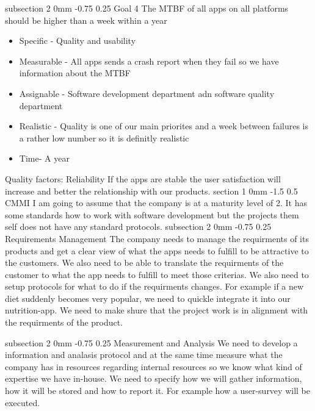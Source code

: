 \documentclass[a4paper,11pt]{article}
\makeatletter
\renewcommand{\section}{\@startsection
   {section}%
   {1}%
   {0mm}%
   {-1.5\baselineskip}%
   {0.5\baselineskip}%
   {\sffamily\bfseries\upshape\normalsize}}%
\renewcommand{\subsection}{\@startsection
   {subsection}%
   {2}%
   {0mm}%
   {-0.75\baselineskip}%
   {0.25\baselineskip}%
   {\rmfamily\normalfont\slshape\normalsize}}%
\makeatother
\begin{document}
\subsection{Goal 4}
The MTBF of all apps on all platforms should be higher than a week within a year
\begin{itemize}
\item Specific - Quality and usability
\item Measurable - All apps sends a crash report when they fail so we have information about the MTBF
\item Assignable - Software development department adn software quality department
\item Realistic - Quality is one of our main priorites and a week between failures is a rather low number so it is definitly realistic
\item Time- A year
\end{itemize}
Quality factors: Reliability \newline
If the apps are stable the user satisfaction will increase and better the relationship with our products.
\section{CMMI}
I am going to assume that the company is at a maturity level of 2. It has some standards how to work with software development but the projects them self does not have any standard protocols.
\subsection{Requirements Management}
 The company needs to manage the requirments of its products and get a clear view of what the apps needs to fulfill to be attractive to the customers. We also need to be able to translate the requirments of the customer to what the app needs to fulfill to meet those criterias. \newline
 \newline We also need to setup protocols for what to do if the requirments changes. For example if a new diet suddenly becomes very popular, we need to quickle integrate it into our nutrition-app. We need to make shure that the project work is in alignment with the requirments of the product.
 
 \subsection{Measurement and Analysis }
 We need to develop a information and analasis protocol and at the same time measure what the company has in resources regarding internal resources so we know what kind of expertise we have in-house. We need to specify how we will gather information, how it will be stored and how to report it. For example how a user-survey will be executed.
\end{document}
